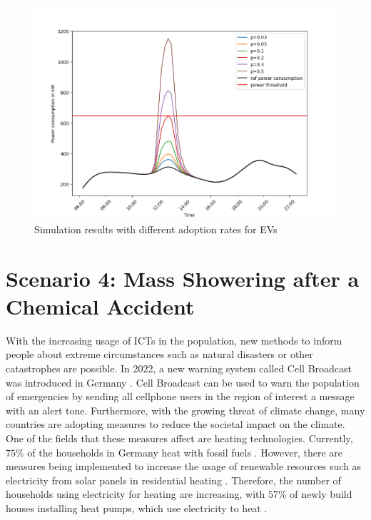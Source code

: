 \begin{figure}[!ht]
    \center
    \includegraphics[scale=.5]{figs/eval/scenario3/changingadoption.png}
    \caption{Simulation results with different adoption rates for EVs}
    \label{thirdscenarioresultsdiffadoption}
\end{figure}

\section{Scenario 4: Mass Showering after a Chemical Accident}
\label{scenario4total}

With the increasing usage of ICTs in the population,
new methods to inform people about extreme circumstances
such as natural disasters or other catastrophes are possible. In 2022,
a new warning system called Cell Broadcast was introduced in Germany
\cite{TEAlert}. Cell Broadcast can be used to warn the population
of emergencies by sending all cellphone users in the 
region of interest a message with an alert tone.
Furthermore, with the growing threat of climate change, many countries
are adopting measures to reduce the societal impact on the
climate. One of the fields that these measures affect 
are heating technologies. Currently, $75\%$ of the households 
in Germany heat with fossil fuels \cite{bdewhouhseholds}. 
However, there are measures being 
implemented to increase the usage of renewable resources such 
as electricity from solar panels in residential heating
\cite{heizungsgesetz}. Therefore, the number of households 
using electricity for heating are increasing, with 
$57\%$ of newly build houses installing 
heat pumps, which use electricity to heat
\cite{heatingpumps}.


